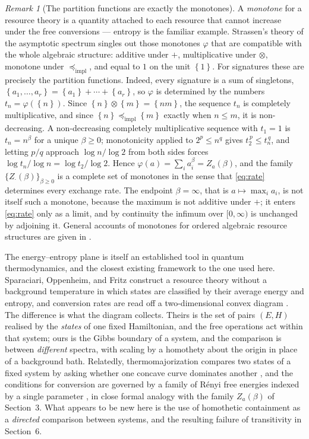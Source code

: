 \documentclass[11pt]{article}
\theoremstyle{definition}
\theoremstyle{remark}
\newtheorem{remark}{Remark}
\newcommand{\sig}[1]{\left\{#1\right\}}
\newcommand{\impl}{\preccurlyeq_{\mathrm{impl}}}
\begin{document}
\begin{remark}[The partition functions are exactly the monotones]
\label{rem:monotones}
A \emph{monotone} for a resource theory is a quantity attached to each resource
that cannot increase under the free conversions --- entropy is the familiar
example.  Strassen's theory of the asymptotic spectrum \cite{strassen-1988}
singles out those monotones \(\varphi\) that are compatible with the whole
algebraic structure: additive under \(+\), multiplicative under \(\otimes\),
monotone under \(\impl\), and equal to \(1\) on the unit \(\sig{1}\).  For
signatures these are precisely the partition functions.  Indeed, every signature is a
sum of singletons, \(\sig{a_1,\ldots,a_r}=\sig{a_1}+\cdots+\sig{a_r}\), so
\(\varphi\) is determined by the numbers \(t_n=\varphi(\sig{n})\).  Since
\(\sig{n}\otimes\sig{m}=\sig{nm}\), the sequence \(t_n\) is completely
multiplicative, and since \(\sig{n}\impl\sig{m}\) exactly when \(n\leq m\), it
is non-decreasing.  A non-decreasing completely multiplicative sequence with
\(t_1=1\) is \(t_n=n^\beta\) for a unique \(\beta\geq0\); monotonicity applied
to \(2^p\leq n^q\) gives \(t_2^{\,p}\leq t_n^{\,q}\), and letting \(p/q\)
approach \(\log n/\log 2\) from both sides forces
\(\log t_n/\log n=\log t_2/\log 2\).  Hence
\(\varphi(a)=\sum_i a_i^\beta=Z_a(\beta)\), and the family
\(\{Z_\cdot(\beta)\}_{\beta\geq0}\) is a complete set of monotones in the sense
that \eqref{eq:rate} determines every exchange rate.  The endpoint
\(\beta=\infty\), that is \(a\mapsto\max_i a_i\), is not itself such a
monotone, because the maximum is not additive under \(+\); it enters
\eqref{eq:rate} only as a limit, and by continuity the infimum over
\([0,\infty)\) is unchanged by adjoining it.  General accounts of monotones for
ordered algebraic resource structures are given in \cite{fritz-2017}.
\end{remark}

The energy--entropy plane is itself an established tool in quantum
thermodynamics, and the closest existing framework to the one used here.
Sparaciari, Oppenheim, and Fritz construct a resource theory without a
background temperature in which states are classified by their average energy
and entropy, and conversion rates are read off a two-dimensional convex
diagram \cite{sparaciari-oppenheim-fritz-2017}.  The difference is what the
diagram collects.  Theirs is the set of pairs \((E,H)\) realised by the
\emph{states} of one fixed Hamiltonian, and the free operations act within
that system; ours is the Gibbs boundary of a system, and the comparison is
between \emph{different} spectra, with scaling by a homothety about the origin
in place of a background bath.  Relatedly, thermomajorization compares two
states of a fixed system by asking whether one concave curve dominates another
\cite{horodecki-oppenheim-2013}, and the conditions for conversion are
governed by a family of R\'enyi free energies indexed by a single parameter
\cite{brandao-et-al-2015}, in close formal analogy with the family
\(Z_a(\beta)\) of Section~3.  What appears to be new here is the use of
homothetic containment as a \emph{directed} comparison between systems, and
the resulting failure of transitivity in Section~6.
\end{document}
